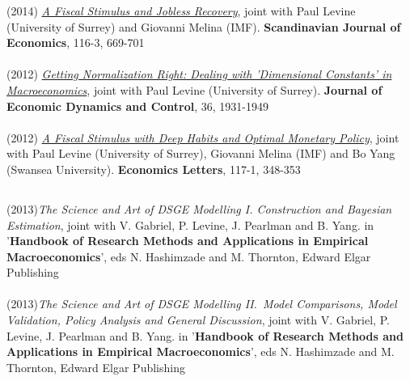 \documentclass[margin, 11pt]{res} %
\begin{document}
\begin{resume}
(2014) \emph{\href{http://onlinelibrary.wiley.com/doi/10.1111/sjoe.12066/abstract}{A Fiscal Stimulus and Jobless Recovery}}, joint with  Paul Levine (University of Surrey) and Giovanni Melina (IMF). \textbf{Scandinavian Journal of Economics}, 116-3, 669-701\\
\\
(2012) \emph{\href{http://www.sciencedirect.com/science/article/pii/S0165188912001339}{Getting Normalization Right: Dealing with 'Dimensional Constants' in Macroeconomics}}, joint with Paul Levine (University of Surrey). \textbf{Journal of Economic Dynamics and Control},  36, 1931-1949\\
\\
(2012) \emph{\href{http://www.sciencedirect.com/science/article/pii/S0165176512003199}{A Fiscal Stimulus with Deep Habits and Optimal Monetary Policy}}, joint with  Paul Levine (University of Surrey), Giovanni Melina (IMF) and Bo Yang (Swansea University). \textbf{Economics Letters}, 117-1, 348-353

\subsection{}
(2013)\emph{The Science and  Art of DSGE Modelling I. Construction and Bayesian Estimation}, joint with V. Gabriel,  P. Levine, J. Pearlman and B. Yang.   in  '\textbf{Handbook of Research Methods and Applications in Empirical Macroeconomics}', eds N. Hashimzade and M. Thornton,  Edward Elgar Publishing\\
\\
(2013)\emph{The Science and  Art of DSGE Modelling  II.~Model Comparisons, Model Validation, Policy Analysis and General Discussion}, joint with V. Gabriel,  P. Levine, J. Pearlman and B. Yang. in  '\textbf{Handbook of Research Methods and Applications in Empirical Macroeconomics}', eds N. Hashimzade and M. Thornton,  Edward Elgar Publishing










\end{resume}
\end{document}
